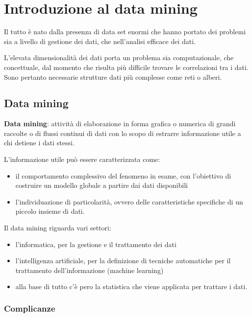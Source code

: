 \chapter{Introduzione al data mining}\label{lezione-2---introduzione-al-data-mining}

Il tutto è nato dalla presenza di data set enormi che hanno portato dei
problemi sia a livello di gestione dei dati, che nell'analisi efficace
dei dati.

L'elevata dimensionalità dei dati porta un problema sia computazionale,
che concettuale, dal momento che risulta più difficile trovare le
correlazioni tra i dati. Sono pertanto necessarie strutture dati più
complesse come reti o alberi.

\section{Data mining}\label{data-mining}

\textbf{Data mining}: attività di elaborazione in forma grafica o
numerica di grandi raccolte o di flussi continui di dati con lo scopo di
estrarre informazione utile a chi detiene i dati stessi.

L'informazione utile può essere caratterizzata come:

\begin{itemize}
\item
  il comportamento complessivo del fenomeno in esame, con l'obiettivo di
  costruire un modello globale a partire dai dati disponibili
\item
  l'individuazione di particolarità, ovvero delle caratteristiche
  specifiche di un piccolo insieme di dati.
\end{itemize}

Il data mining riguarda vari settori:

\begin{itemize}
\item
  l'informatica, per la gestione e il trattamento dei dati
\item
  l'intelligenza artificiale, per la definizione di tecniche automatiche
  per il trattamento dell'informazione (machine learning)
\item
  alla base di tutto c'è pero la statistica che viene applicata per
  trattare i dati.
\end{itemize}

\subsection{Complicanze}\label{complicanze}

